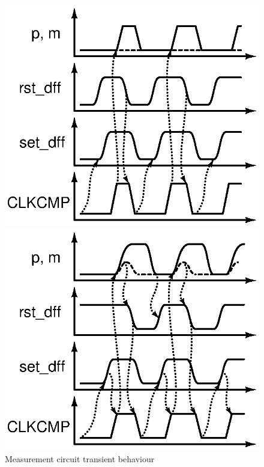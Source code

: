 \begin{figure}[htp]
	\begin{minipage}[b]{0.47\linewidth}
	\includegraphics[width=\linewidth]{Chapter5/Figs/test_delay_comp_new_tare0_bypass1.ps}
	\end{minipage}
	\begin{minipage}[b]{0.47\linewidth}
	\includegraphics[width=\linewidth]{Chapter5/Figs/test_delay_comp_new_tare1_bypass1.ps}
	\end{minipage}
	\caption{Measurement circuit transient behaviour}
	\label{fig:meas_circ_trans}
	\vspace{-1em}
\end{figure}

